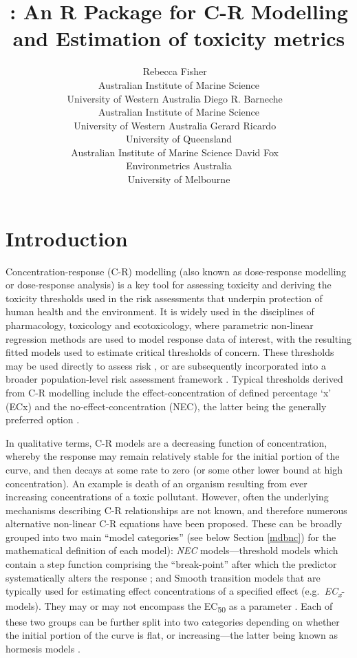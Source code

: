 \documentclass[
  shortnames]{jss}
\author{
			Rebecca Fisher
					~\orcidlink{0000-0001-5148-6731}
				\\
		Australian Institute of Marine Science
					\\University of Western Australia
				 \And
			Diego R. Barneche
					~\orcidlink{0000-0002-4568-2362}
				\\
		Australian Institute of Marine Science
					\\University of Western Australia
				 \AND
			Gerard Ricardo
					~\orcidlink{0000-0002-7761-0806}
				\\
		University of Queensland
					\\Australian Institute of Marine Science
				 \And
			David Fox
					~\orcidlink{0000-0002-3178-7243}
				\\
		Environmetrics Australia
					\\University of Melbourne
				}
\title{\pkg{bayesnec}: An R Package for C-R Modelling and Estimation of toxicity metrics}
\begin{document}
\hypertarget{introduction}{%
\section{Introduction}\label{introduction}}

Concentration-response (C-R) modelling (also known as dose-response modelling or dose-response analysis) is a key tool for assessing toxicity and deriving the toxicity thresholds used in the risk assessments that underpin protection of human health and the environment. It is widely used in the disciplines of pharmacology, toxicology and ecotoxicology, where parametric non-linear regression methods are used to model response data of interest, with the resulting fitted models used to estimate critical thresholds of concern. These thresholds may be used directly to assess risk \citep[e.g see][]{fisher2018c}, or are subsequently incorporated into a broader population-level risk assessment framework \citep[e.g.][]{Warne2015}. Typical thresholds derived from C-R modelling include the effect-concentration of defined percentage `x' (ECx) and the no-effect-concentration (NEC), the latter being the generally preferred option \citep{Fox2008, Warne2015, Warne2018c}.

In qualitative terms, C-R models are a decreasing function of concentration, whereby the response may remain relatively stable for the initial portion of the curve, and then decays at some rate to zero (or some other lower bound at high concentration). An example is death of an organism resulting from ever increasing concentrations of a toxic pollutant. However, often the underlying mechanisms describing C-R relationships are not known, and therefore numerous alternative non-linear C-R equations have been proposed. These can be broadly grouped into two main ``model categories'' (see below Section \ref{mdbnc}) for the mathematical definition of each model): \emph{NEC} models---threshold models which contain a step function comprising the ``break-point'' after which the predictor systematically alters the response \citep{Fox2010}; and Smooth transition models that are typically used for estimating effect concentrations of a specified effect (e.g.~\emph{EC\textsubscript{x}}- models). They may or may not encompass the EC\textsubscript{50} as a parameter \citep{Ritz2016}. Each of these two groups can be further split into two categories depending on whether the initial portion of the curve is flat, or increasing---the latter being known as hormesis models \citep{Ritz2016}.
\end{document}
